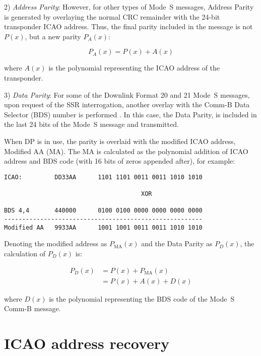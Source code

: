 2) \emph{Address Parity}: However, for other types of Mode~S messages, Address Parity is generated by overlaying the normal CRC remainder with the 24-bit transponder ICAO address. Thus, the final parity included in the message is not $P(x)$, but a new parity $P_A(x)$:

\begin{equation}
  P_A(x) = P(x) + A(x)
\end{equation}

\noindent where $A(x)$ is the polynomial representing the ICAO address of the transponder.

3) \emph{Data Parity}: For some of the Downlink Format 20 and 21 Mode~S messages, upon request of the SSR interrogation, another overlay with the Comm-B Data Selector (BDS) number is performed \cite{gertz1984}. In this case, the Data Parity, is included in the last 24 bits of the Mode~S message and transmitted.

When DP is in use, the parity is overlaid with the modified ICAO address, Modified AA (MA). The MA is calculated as the polynomial addition of ICAO address and BDS code (with 16 bits of zeros appended after), for example:

\begin{verbatim}
ICAO:         DD33AA      1101 1101 0011 0011 1010 1010

                                      XOR

BDS 4,4       440000      0100 0100 0000 0000 0000 0000
-------------------------------------------------------
Modified AA   9933AA      1001 1001 0011 0011 1010 1010
\end{verbatim}

Denoting the modified address as $P_\mathrm{MA}(x)$ and the Data Parity as $P_D(x)$, the calculation of $P_D(x)$ is:

\begin{equation}
  \begin{split}
    P_D(x) &= P(x) + P_\mathrm{MA}(x) \\
     &= P(x) + A(x) + D(x)
  \end{split}
\end{equation}

\noindent where $D(x)$ is the polynomial representing the BDS code of the Mode~S Comm-B message.


\section{ICAO address recovery}

